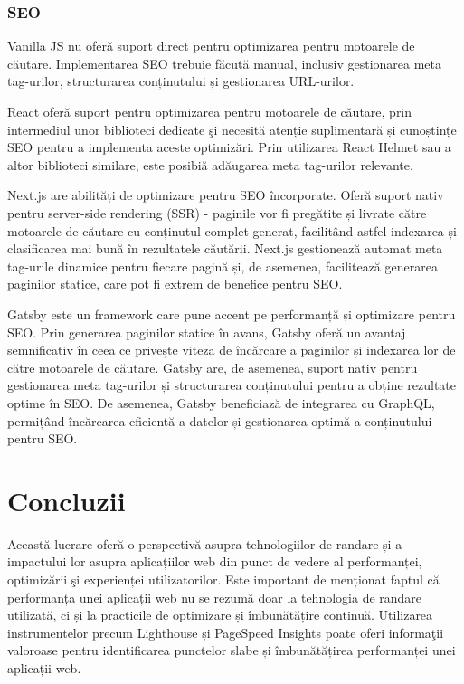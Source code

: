 \documentclass[12pt, a4paper]{report}
\begin{document}
\subsection{SEO}

Vanilla JS nu oferă suport direct pentru optimizarea pentru motoarele de căutare. Implementarea SEO trebuie făcută manual, inclusiv gestionarea meta tag-urilor, structurarea conținutului și gestionarea URL-urilor.

React oferă suport pentru optimizarea pentru motoarele de căutare, prin intermediul unor biblioteci dedicate \c si necesită atenție suplimentară și cunoștințe SEO pentru a implementa aceste optimizări. Prin utilizarea React Helmet sau a altor biblioteci similare, este posibi\u a adăugarea meta tag-urilor relevante.

Next.js are abilități de optimizare pentru SEO încorporate. Oferă suport nativ pentru server-side rendering (SSR) - paginile vor fi pregătite și livrate către motoarele de căutare cu conținutul complet generat, facilitând astfel indexarea și clasificarea mai bună în rezultatele căutării. Next.js gestionează automat meta tag-urile dinamice pentru fiecare pagină și, de asemenea, facilitează generarea paginilor statice, care pot fi extrem de benefice pentru SEO.

Gatsby este un framework care pune accent pe performanță și optimizare pentru SEO. Prin generarea paginilor statice în avans, Gatsby oferă un avantaj semnificativ în ceea ce privește viteza de încărcare a paginilor și indexarea lor de către motoarele de căutare. Gatsby are, de asemenea, suport nativ pentru gestionarea meta tag-urilor și structurarea conținutului pentru a obține rezultate optime în SEO. De asemenea, Gatsby beneficiază de integrarea cu GraphQL, permițând încărcarea eficientă a datelor și gestionarea optimă a conținutului pentru SEO.

\chapter{Concluzii}

Această lucrare ofer\u a o perspectivă asupra tehnologiilor de randare și a impactului lor asupra aplicațiilor web din punct de vedere al performanței, optimizării \c si experienței utilizatorilor.
Este important de menționat faptul că performanța unei aplicații web nu se rezumă doar la tehnologia de randare utilizată, ci și la practicile de optimizare și îmbunătățire continuă. Utilizarea instrumentelor precum Lighthouse și PageSpeed Insights poate oferi informa\c tii valoroase pentru identificarea punctelor slabe și îmbunătățirea performanței unei aplicații web.
\end{document}
